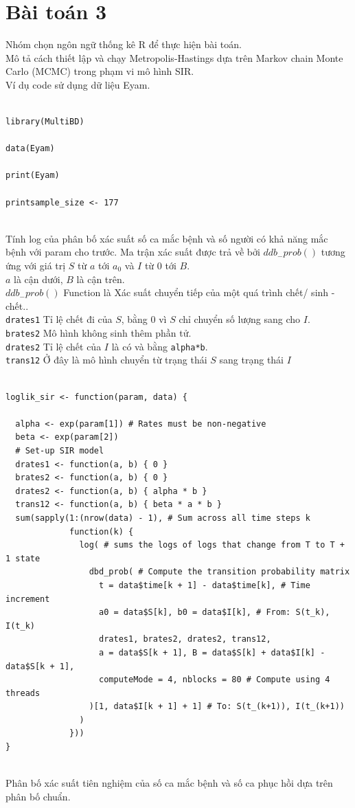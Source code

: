 \documentclass[a4paper]{article}
\begin{document}
\section{Bài toán 3}
Nhóm chọn ngôn ngữ thống kê R để thực hiện bài toán.\\

Mô tả cách thiết lập và chạy Metropolis-Hastings dựa trên Markov chain Monte Carlo (MCMC) trong phạm vi mô hình SIR.\\
Ví dụ code sử dụng dữ liệu Eyam.\\
\begin{lstlisting}

library(MultiBD)

data(Eyam)

print(Eyam)

printsample_size <- 177
\end{lstlisting}
\\
Tính log của phân bố xác suất số ca mắc bệnh và số người có khả năng mắc bệnh với param cho trước. Ma trận xác suất được trả về bởi $ ddb_{-}prob() $ tương ứng với giá trị $S$ từ $a$ tới $a_{0}$  và $I$ từ $0$ tới $B$.\\
$a$ là cận dưới, $B$ là cận trên.
\\
$ ddb_{-}prob() $ Function là Xác suất chuyển tiếp của một quá trình chết/ sinh - chết..\\
\lstinline{drates1} Tỉ lệ chết đi của $S$, bằng 0 vì $S$ chỉ chuyển số lượng sang cho $I$.\\
\lstinline{brates2} Mô hình không sinh thêm phần tử.\\
\lstinline{drates2} Tỉ lệ chết của $I$ là có và bằng \lstinline{alpha*b}.\\
\lstinline{trans12} Ở đây là mô hình chuyển từ trạng thái $S$ sang trạng thái $I$
\\
\begin{lstlisting}

loglik_sir <- function(param, data) {
                                            
  alpha <- exp(param[1]) # Rates must be non-negative
  beta <- exp(param[2])
  # Set-up SIR model
  drates1 <- function(a, b) { 0 }                    
  brates2 <- function(a, b) { 0 }                     
  drates2 <- function(a, b) { alpha * b }            
  trans12 <- function(a, b) { beta * a * b }          
  sum(sapply(1:(nrow(data) - 1), # Sum across all time steps k
             function(k) {
               log( # sums the logs of logs that change from T to T + 1 state
                 dbd_prob( # Compute the transition probability matrix
                   t = data$time[k + 1] - data$time[k], # Time increment
                   a0 = data$S[k], b0 = data$I[k], # From: S(t_k), I(t_k)
                   drates1, brates2, drates2, trans12,
                   a = data$S[k + 1], B = data$S[k] + data$I[k] - data$S[k + 1],
                   computeMode = 4, nblocks = 80 # Compute using 4 threads
                 )[1, data$I[k + 1] + 1] # To: S(t_(k+1)), I(t_(k+1))
               )
             }))
}
\end{lstlisting}
\\
Phân bố xác suất tiên nghiệm của số ca mắc bệnh và số ca phục hồi dựa trên phân bố chuẩn.
\end{document}
